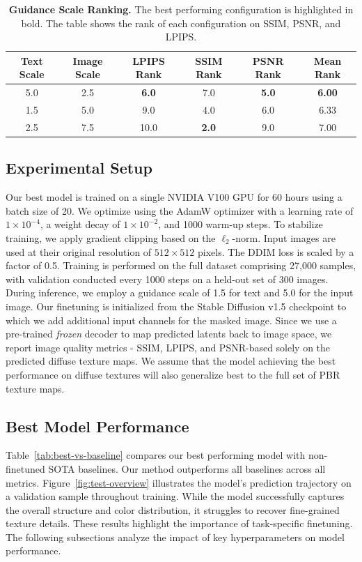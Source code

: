 \documentclass[11pt,twocolumn]{article}
\begin{document}
\begin{table}[t]
  \centering
  \begin{tabular}{cc|cccc}
    \toprule
    \textbf{Text Scale} & \textbf{Image Scale} & \textbf{LPIPS Rank} & \textbf{SSIM Rank} & \textbf{PSNR Rank}  & \textbf{Mean Rank} \\
    \midrule
    5.0 & 2.5 & \textbf{6.0} & 7.0 & \textbf{5.0}  & \textbf{6.00} \\
    1.5 & 5.0 & 9.0 & 4.0 & 6.0 & 6.33 \\
    2.5 & 7.5 & 10.0 & \textbf{2.0} & 9.0 & 7.00 \\
    \bottomrule
  \end{tabular}
  \caption{\textbf{Guidance Scale Ranking.} 
  The best performing configuration is highlighted in bold. 
  The table shows the rank of each configuration on SSIM, PSNR, and LPIPS.}
  \label{tab:guidance-ranking}
\end{table}

\vspace{-2.0em}
\subsection{Experimental Setup}
Our best model is trained on a single NVIDIA V100 GPU for 60 hours using a batch size of 20. 
We optimize using the AdamW optimizer with a learning rate of \(1 \times 10^{-4}\), 
a weight decay of \(1 \times 10^{-2}\), and 1000 warm-up steps. 
To stabilize training, we apply gradient clipping based on the \(\ell_2\)-norm. 
Input images are used at their original resolution of \(512 \times 512\) pixels. 
The DDIM loss is scaled by a factor of 0.5. Training is performed on the full dataset comprising 27{,}000 samples, 
with validation conducted every 1000 steps on a held-out set of 300 images. 
During inference, we employ a guidance scale of 1.5 for text and 5.0 for the input image. 
Our finetuning is initialized from the Stable Diffusion v1.5 checkpoint \cite{sd} to which we add additional input channels
for the masked image. Since we use a pre-trained \textit{frozen} decoder to map predicted latents 
back to image space, we report image quality metrics - SSIM, LPIPS, and PSNR-based 
solely on the predicted diffuse texture maps. We assume that the model achieving the 
best performance on diffuse textures will also generalize best to the full set of PBR texture maps.

\subsection{Best Model Performance}
Table~\ref{tab:best-vs-baseline} compares our best performing model with non-finetuned SOTA baselines. 
Our method outperforms all baselines across all metrics. Figure~\ref{fig:test-overview} illustrates the model's 
prediction trajectory on a validation sample throughout training. While the model successfully captures the overall 
structure and color distribution, it struggles to recover fine-grained texture details. 
These results highlight the importance of task-specific finetuning. The following subsections analyze the impact of 
key hyperparameters on model performance.
\end{document}
